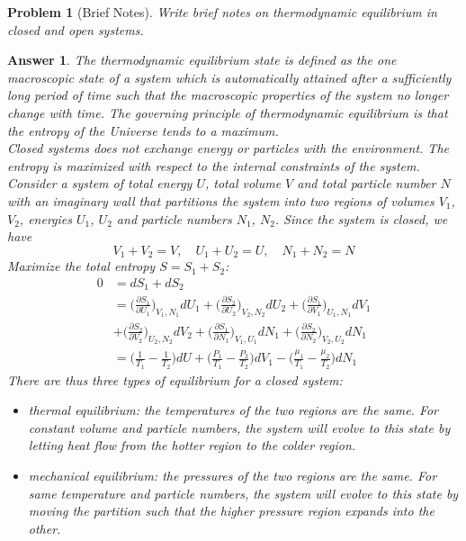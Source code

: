 \documentclass[a4paper]{article}
\theoremstyle{new2}
\newtheorem{ans}{Answer}[section]
\theoremstyle{new}
\newtheorem{qns}{Problem}[section]
\begin{document}
\begin{qns}[Brief Notes]
Write brief notes on thermodynamic equilibrium in closed and open systems.
\end{qns}
\begin{ans}
The thermodynamic equilibrium state is defined as the one macroscopic state of a system which is automatically attained after a sufficiently long period of time such that the macroscopic properties of the system no longer change with time. The governing principle of thermodynamic equilibrium is that the entropy of the Universe tends to a maximum.\\[5pt]
Closed systems does not exchange energy or particles with the environment. The entropy is maximized with respect to the internal constraints of the system. Consider a system of total energy $U$, total volume $V$ and total particle number $N$ with an imaginary wall that partitions the system into two regions of volumes $V_1$, $V_2$, energies $U_1$, $U_2$ and particle numbers $N_1$, $N_2$. Since the system is closed, we have
$$V_1+V_2=V,\quad U_1+U_2=U,\quad N_1+N_2=N$$
Maximize the total entropy $S=S_1+S_2$:
\begin{align}
    0&=dS_1+dS_2\nonumber\\&=\bigg(\frac{\partial S_1}{\partial U_1}\bigg)_{V_1,N_1}dU_1+\bigg(\frac{\partial S_2}{\partial U_2}\bigg)_{V_2,N_2}dU_2+\bigg(\frac{\partial S_1}{\partial V_1}\bigg)_{U_1,N_1}dV_1\nonumber\\&+\bigg(\frac{\partial S_2}{\partial V_2}\bigg)_{U_2,N_2}dV_2+\bigg(\frac{\partial S_1}{\partial N_1}\bigg)_{V_1,U_1}dN_1+\bigg(\frac{\partial S_2}{\partial N_2}\bigg)_{V_2,U_2}dN_1\nonumber\\&=\bigg(\frac{1}{T_1}-\frac{1}{T_2}\bigg)dU+\bigg(\frac{P_1}{T_1}-\frac{P_2}{T_2}\bigg)dV_1-\bigg(\frac{\mu_1}{T_1}-\frac{\mu_2}{T_2}\bigg)dN_1\nonumber
\end{align}
There are thus three types of equilibrium for a closed system:
\begin{itemize}
    \item thermal equilibrium: the temperatures of the two regions are the same. For constant volume and particle numbers, the system will evolve to this state by letting heat flow from the hotter region to the colder region.
    \item mechanical equilibrium: the pressures of the two regions are the same. For same temperature and particle numbers, the system will evolve to this state by moving the partition such that the higher pressure region expands into the other.

\end{itemize}
\end{ans}
\end{document}
